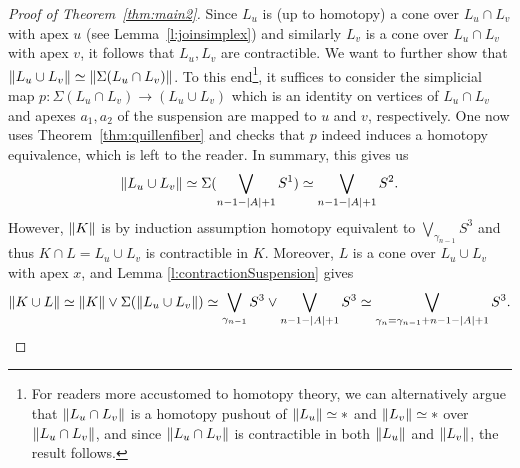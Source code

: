 \documentclass[a4paper, v2021]{lipics-v2021}
\theoremstyle{plain}
\theoremstyle{definition}
\DeclarePairedDelimiter{\gr}{\lVert}{\rVert}
\begin{document}
\begin{proof}[Proof of Theorem~\ref{thm:main2}]
Since $L_u$ is (up to homotopy) a cone over $L_u \cap L_v$ with apex $u$ (see Lemma~\ref{l:joinsimplex}) and similarly $L_v$ is a cone over $L_u \cap L_v$ with apex $v$, it follows that $L_u, L_v$ are contractible. We want to further show that $\gr{L_u \cup L_v} \simeq \gr{\Sigma(L_u\cap L_v)}$. To this end\footnote{For readers more accustomed to homotopy theory, we can alternatively argue that $\gr{L_u \cap L_v}$ is a homotopy pushout of $\gr{L_u} \simeq * $ and $\gr{L_v} \simeq *$ over $\gr{L_{u}\cap L_v}$, and since $\gr{L_{u}\cap L_v}$ is contractible in both $\gr{L_u}$ and $\gr{L_v}$, the result follows.}, it suffices to consider the simplicial map $p\colon \Sigma(L_u\cap L_v) \to (L_u \cup L_v)$ which is an identity on vertices of $L_u \cap L_v$ and apexes ${a_1, a_2}$ of the suspension are mapped to $u$ and $v$, respectively. One now uses Theorem~\ref{thm:quillenfiber} and checks that $p$ indeed induces a homotopy equivalence, which is left to the reader. In summary, this gives us
\[\gr{L_u \cup L_v} \simeq \Sigma(\bigvee_{{n-1} - |A| + 1} S^1) \simeq \bigvee_{{n-1} - |A| + 1} S^2.\]
However, $\gr{K}$ is by induction assumption homotopy equivalent to $\bigvee_{\gamma_{n-1}} S^3$ and thus $K \cap L = L_u \cup L_v$ is contractible in $K$. Moreover, $L$ is a cone over $L_u \cup L_v$ with apex $x$, and Lemma \ref{l:contractionSuspension} gives 
\[\gr{K \cup L} \simeq \gr{K} \vee \Sigma(\gr{L_u \cup L_v}) \simeq \bigvee_{\gamma_{n-1}} S^3 \vee \bigvee_{{n-1} - |A| + 1} S^3 \simeq \bigvee_{\gamma_n = \gamma_{n-1} + {n-1} - |A| + 1} S^3.\]
\end{proof}
\end{document}
